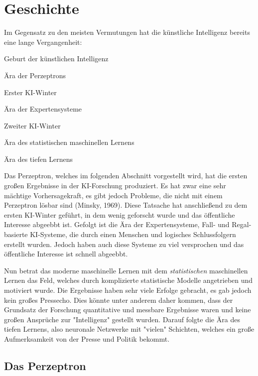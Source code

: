 	\section{Geschichte}
		Im Gegensatz zu den meisten Vermutungen hat die künstliche Intelligenz bereits eine lange Vergangenheit:
		\begin{description}[leftmargin = 2cm]
			\item[1950er] Geburt der künstlichen Intelligenz
			\item[1960er] Ära der Perzeptrons
			\item[1970er] Erster KI-Winter
			\item[1980er] Ära der Expertensysteme
			\item[1990er] Zweiter KI-Winter
			\item[2000er] Ära des statistischen maschinellen Lernens
			\item[2000er] Ära des tiefen Lernens
		\end{description}
		Das Perzeptron, welches im folgenden Abschnitt vorgestellt wird, hat die ersten großen Ergebnisse in der KI-Forschung produziert. Es hat zwar eine sehr mächtige Vorhersagekraft, es gibt jedoch Probleme, die nicht mit einem Perzeptron lösbar sind (Minsky, 1969). Diese Tatsache hat anschließend zu dem ersten KI-Winter geführt, in dem wenig geforscht wurde und das öffentliche Interesse abgeebbt ist. Gefolgt ist die Ära der Expertensysteme, Fall- und Regal-basierte KI-Systeme, die durch einen Menschen und logisches Schlussfolgern erstellt wurden. Jedoch haben auch diese Systeme zu viel versprochen und das öffentliche Interesse ist schnell abgeebbt.

		Nun betrat das moderne maschinelle Lernen mit dem \emph{statistischen} maschinellen Lernen das Feld, welches durch komplizierte statistische Modelle angetrieben und motiviert wurde. Die Ergebnisse haben sehr viele Erfolge gebracht, es gab jedoch kein großes Pressecho. Dies könnte unter anderem daher kommen, dass der Grundsatz der Forschung quantitative und messbare Ergebnisse waren und keine großen Ansprüche zur "Intelligenz" gestellt wurden. Darauf folgte die Ära des tiefen Lernens, also neuronale Netzwerke mit "vielen" Schichten, welches ein große Aufmerksamkeit von der Presse und Politik bekommt.

		\subsection{Das Perzeptron}
			\label{subsec:perceptron}

